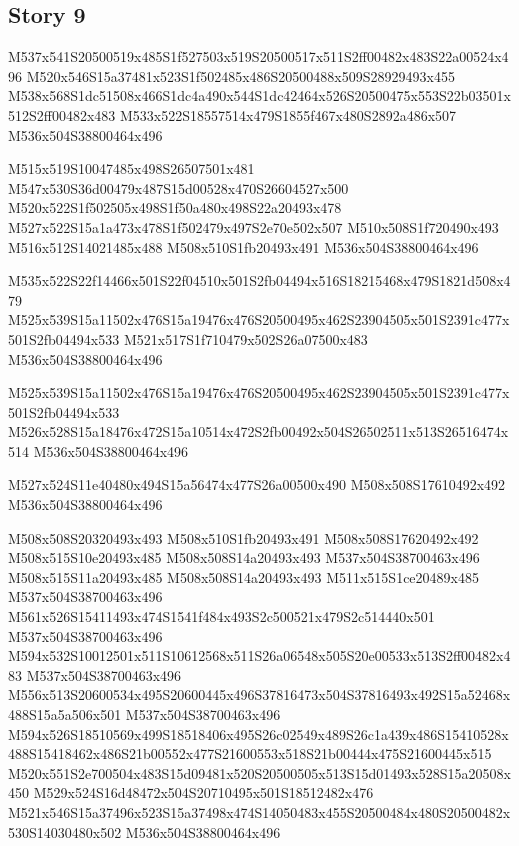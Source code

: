 \documentclass{article}
\begin{document}
\subsection{Story 9}

\begin{multicols}{5}
\begin{center}
M537x541S20500519x485S1f527503x519S20500517x511S2ff00482x483S22a00524x496 %
M520x546S15a37481x523S1f502485x486S20500488x509S28929493x455 %
M538x568S1dc51508x466S1dc4a490x544S1dc42464x526S20500475x553S22b03501x512S2ff00482x483 %
M533x522S18557514x479S1855f467x480S2892a486x507 %
M536x504S38800464x496 %

M515x519S10047485x498S26507501x481 %
M547x530S36d00479x487S15d00528x470S26604527x500 %
M520x522S1f502505x498S1f50a480x498S22a20493x478 %
M527x522S15a1a473x478S1f502479x497S2e70e502x507 %
M510x508S1f720490x493 %
M516x512S14021485x488 %
M508x510S1fb20493x491 %
M536x504S38800464x496 %

M535x522S22f14466x501S22f04510x501S2fb04494x516S18215468x479S1821d508x479 %
M525x539S15a11502x476S15a19476x476S20500495x462S23904505x501S2391c477x501S2fb04494x533 %
M521x517S1f710479x502S26a07500x483 %
M536x504S38800464x496 %

M525x539S15a11502x476S15a19476x476S20500495x462S23904505x501S2391c477x501S2fb04494x533 %
M526x528S15a18476x472S15a10514x472S2fb00492x504S26502511x513S26516474x514 %
M536x504S38800464x496 %

M527x524S11e40480x494S15a56474x477S26a00500x490 %
M508x508S17610492x492 %
M536x504S38800464x496 %

M508x508S20320493x493 %
M508x510S1fb20493x491 %
M508x508S17620492x492 %
M508x515S10e20493x485 %
M508x508S14a20493x493 %
M537x504S38700463x496 %
M508x515S11a20493x485 %
M508x508S14a20493x493 %
M511x515S1ce20489x485 %
M537x504S38700463x496 %
M561x526S15411493x474S1541f484x493S2c500521x479S2c514440x501 %
M537x504S38700463x496 %
M594x532S10012501x511S10612568x511S26a06548x505S20e00533x513S2ff00482x483 %
M537x504S38700463x496 %
M556x513S20600534x495S20600445x496S37816473x504S37816493x492S15a52468x488S15a5a506x501 %
M537x504S38700463x496 %
M594x526S18510569x499S18518406x495S26c02549x489S26c1a439x486S15410528x488S15418462x486S21b00552x477S21600553x518S21b00444x475S21600445x515 %
M520x551S2e700504x483S15d09481x520S20500505x513S15d01493x528S15a20508x450 %
M529x524S16d48472x504S20710495x501S18512482x476 %
M521x546S15a37496x523S15a37498x474S14050483x455S20500484x480S20500482x530S14030480x502 %
M536x504S38800464x496 %


\end{center}
\end{multicols}
\end{document}
